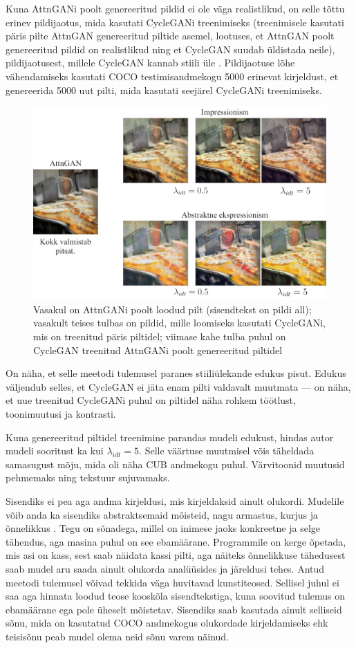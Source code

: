 \documentclass{vilgym}
\begin{document}
	Kuna AttnGANi poolt genereeritud pildid ei ole väga realistlikud, on selle tõttu erinev pildijaotus, mida kasutati \mbox{CycleGANi} treenimiseks (treenimisele kasutati päris pilte AttnGAN genereeritud piltide asemel, lootuses, et AttnGAN poolt genereeritud pildid on realistlikud ning et CycleGAN suudab üldistada neile), pildijaotusest, millele CycleGAN kannab stiili üle . Pildijaotuse lõhe vähendamiseks kasutati COCO testimisandmekogu 5000 erinevat kirjeldust, et genereerida 5000 uut pilti, mida kasutati seejärel CycleGANi treenimiseks.

	\begin{figure}[t]
		\includegraphics[width=\linewidth]{images/coco.png}
		\caption{Vasakul on AttnGANi poolt loodud pilt (sisendtekst on pildi all); vasakult teises tulbas on pildid, mille loomiseks kasutati CycleGANi, mis on treenitud päris piltidel; viimase kahe tulba puhul on CycleGAN treenitud AttnGANi poolt genereeritud piltidel}
		\label{fig:coco}
	\end{figure}
	On näha, et selle meetodi tulemusel paranes stiiliülekande edukus pisut. Edukus väljendub selles, et CycleGAN ei jäta enam pilti valdavalt muutmata --- on näha, et uue treenitud CycleGANi puhul on piltidel näha rohkem töötlust, toonimuutusi ja kontrasti.

	Kuna genereeritud piltidel treenimine parandas mudeli edukust, hindas autor mudeli sooritust ka kui $ \lambda_{idt} = 5 $. Selle väärtuse muutmisel võis täheldada samasugust mõju, mida oli näha CUB andmekogu puhul. Värvitoonid muutusid pehmemaks ning tekstuur sujuvamaks. 

	Sisendiks ei pea aga andma kirjeldusi, mis kirjeldaksid ainult olukordi. Mudelile võib anda ka sisendiks abstraktsemaid mõisteid, nagu armastus, kurjus ja õnnelikkus . Tegu on sõnadega, millel on inimese jaoks konkreetne ja selge tähendus, aga masina puhul on see ebamäärane. Programmile on kerge õpetada, mis asi on kass, sest saab näidata kassi pilti, aga näiteks õnnelikkuse tähedusest saab mudel aru saada ainult olukorda analüüsides ja järeldusi tehes. Antud meetodi tulemusel võivad tekkida väga huvitavad kunstiteosed. Sellisel juhul ei saa aga hinnata loodud teose kooskõla sisendtekstiga, kuna soovitud tulemus on ebamäärane ega pole üheselt mõistetav. Sisendiks saab kasutada ainult selliseid sõnu, mida on kasutatud COCO andmekogus olukordade kirjeldamiseks ehk teisisõnu peab mudel olema neid sõnu varem näinud.
\end{document}
